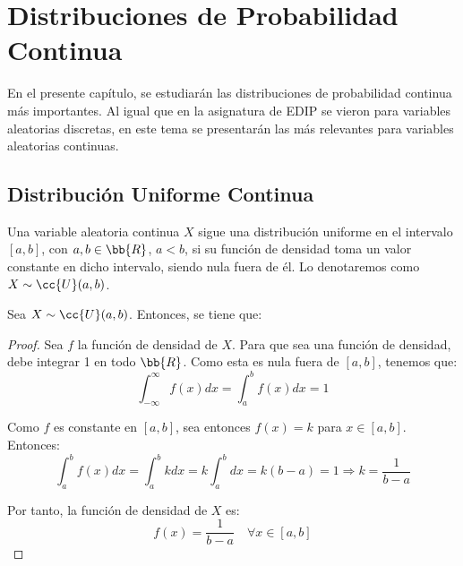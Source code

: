 \chapter{Distribuciones de Probabilidad Continua}

En el presente capítulo, se estudiarán las distribuciones de probabilidad continua más importantes. Al igual que 
en la asignatura de EDIP se vieron para variables aleatorias discretas, en este tema se presentarán las más
relevantes para variables aleatorias continuas.

\section{Distribución Uniforme Continua}

\begin{definicion}
    Una variable aleatoria continua $X$ sigue una distribución uniforme en el intervalo $[a,b]$, con $a,b\in \bb{R}$, $a<b$, si su función de densidad
    toma un valor constante en dicho intervalo, siendo nula fuera de él.
    Lo denotaremos como $X\sim \cc{U}(a,b)$.
\end{definicion}

\begin{prop}
    Sea $X\sim \cc{U}(a,b)$. Entonces, se tiene que:
\end{prop}
\begin{proof}
    Sea $f$ la función de densidad de $X$.
    Para que sea una función de densidad, debe integrar 1 en todo $\bb{R}$.
    Como esta es nula fuera de $[a,b]$, tenemos que:
    \begin{equation*}
        \int_{-\infty}^{\infty} f(x)dx = \int_{a}^{b} f(x)dx = 1
    \end{equation*}

    Como $f$ es constante en $[a,b]$, sea entonces $f(x) = k$ para $x\in [a,b]$. Entonces:
    \begin{equation*}
        \int_{a}^{b} f(x)dx =
        \int_{a}^{b} kdx = k\int_{a}^{b} dx = k(b-a) = 1 \Longrightarrow k = \frac{1}{b-a}
    \end{equation*}

    Por tanto, la función de densidad de $X$ es:
    \begin{equation*}
        f(x) = \frac{1}{b-a} \quad \forall x\in [a,b]
    \end{equation*}
\end{proof}

